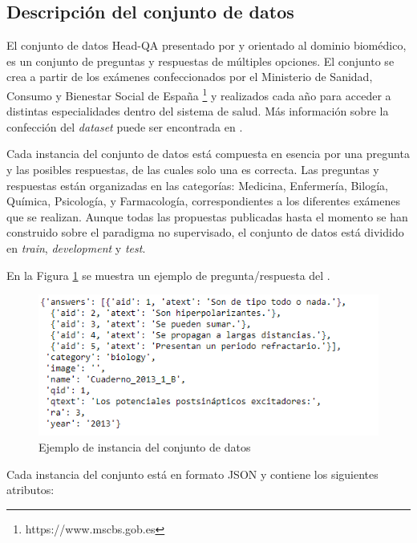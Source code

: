 \subsection{Descripción del conjunto de datos}

El conjunto de datos Head-QA presentado por \cite{2019-head-qa} y orientado al dominio biomédico, es un conjunto de preguntas y respuestas de múltiples opciones. El conjunto se crea a partir de los exámenes confeccionados por el Ministerio de Sanidad, Consumo y Bienestar Social de España \footnote{https://www.mscbs.gob.es} y realizados cada año para acceder a distintas especialidades dentro del sistema de salud. Más información sobre la confección del \textit{dataset} puede ser encontrada en \cite{2019-head-qa}.

Cada instancia del conjunto de datos está compuesta en esencia por una pregunta y las posibles respuestas, de las cuales solo una es correcta. Las preguntas y respuestas están organizadas en las categorías: Medicina, Enfermería, Bilogía, Química, Psicología, y Farmacología, correspondientes a los diferentes exámenes que se realizan. Aunque todas las propuestas publicadas hasta el momento se han construido sobre el paradigma no supervisado, el conjunto de datos está dividido en \textit{train}, \textit{development} y \textit{test}.

En la Figura \ref{sample} se muestra un ejemplo de pregunta/respuesta del . 

\begin{figure}[!tb]
  \begin{center}
    \includegraphics[angle=0, width=1\textwidth]{Graphics/sample.png}
  \end{center}
    \caption{Ejemplo de instancia del conjunto de datos}\label{sample}
\end{figure}

Cada instancia del conjunto está en formato JSON y contiene los siguientes atributos:


